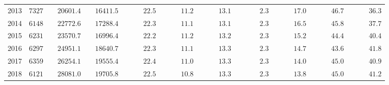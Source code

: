 \begin{table}[ht]
{\begin{tabular}{lcccccccccc}
			2013  & $7327$ & $\phantom{00}20601.4$ & $\phantom{00}16411.5$ & $\phantom{00000}22.5$ & $\phantom{00000}11.2$ & $\phantom{00000}13.1$ & $\phantom{000000}2.3$ & $\phantom{00000}17.0$ & $\phantom{00000}46.7$ & $\phantom{00000}36.3$ \\
			2014  & $6148$ & $\phantom{00}22772.6$ & $\phantom{00}17288.4$ & $\phantom{00000}22.3$ & $\phantom{00000}11.1$ & $\phantom{00000}13.1$ & $\phantom{000000}2.3$ & $\phantom{00000}16.5$ & $\phantom{00000}45.8$ & $\phantom{00000}37.7$ \\
			2015  & $6231$ & $\phantom{00}23570.7$ & $\phantom{00}16996.4$ & $\phantom{00000}22.2$ & $\phantom{00000}11.2$ & $\phantom{00000}13.2$ & $\phantom{000000}2.3$ & $\phantom{00000}15.2$ & $\phantom{00000}44.4$ & $\phantom{00000}40.4$ \\
			2016  & $6297$ & $\phantom{00}24951.1$ & $\phantom{00}18640.7$ & $\phantom{00000}22.3$ & $\phantom{00000}11.1$ & $\phantom{00000}13.3$ & $\phantom{000000}2.3$ & $\phantom{00000}14.7$ & $\phantom{00000}43.6$ & $\phantom{00000}41.8$ \\
			2017  & $6359$ & $\phantom{00}26254.1$ & $\phantom{00}19555.4$ & $\phantom{00000}22.4$ & $\phantom{00000}11.0$ & $\phantom{00000}13.3$ & $\phantom{000000}2.3$ & $\phantom{00000}14.0$ & $\phantom{00000}45.0$ & $\phantom{00000}40.9$ \\
			2018  & $6121$ & $\phantom{00}28081.0$ & $\phantom{00}19705.8$ & $\phantom{00000}22.5$ & $\phantom{00000}10.8$ & $\phantom{00000}13.3$ & $\phantom{000000}2.3$ & $\phantom{00000}13.8$ & $\phantom{00000}45.0$ & $\phantom{00000}41.2$ \\
			\hline 
		\end{tabular}
	}
\end{table}